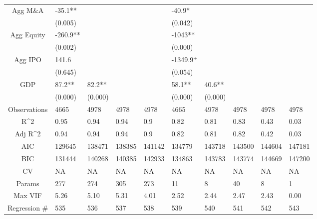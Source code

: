 \documentclass{article}
\begin{document}
\begin{table}[H]
\begin{tabular}{|clllllllll|}
  Agg M\&A & -35.1** &  &  &  & -40.9* &  &  &  &  \\ 
   & (0.005) &  &  &  & (0.042) &  &  &  &  \\ 
  Agg Equity & -260.9** &  &  &  & -1043** &  &  &  &  \\ 
   & (0.002) &  &  &  & (0.000) &  &  &  &  \\ 
  Agg IPO & 141.6 &  &  &  & -1349.9$^{+}$ &  &  &  &  \\ 
   & (0.645) &  &  &  & (0.054) &  &  &  &  \\ 
  GDP & 87.2** & 82.2** &  &  & 58.1** & 40.6** &  &  &  \\ 
   & (0.000) & (0.000) &  &  & (0.000) & (0.000) &  &  &  \\ 
  \hline 
 Observations & 4665 & 4978 & 4978 & 4978 & 4665 & 4978 & 4978 & 4978 & 4978 \\ 
  R^2 & 0.95 & 0.94 & 0.94 & 0.9 & 0.82 & 0.81 & 0.83 & 0.43 & 0.03 \\ 
  Adj R^2 & 0.94 & 0.94 & 0.94 & 0.9 & 0.82 & 0.81 & 0.82 & 0.42 & 0.03 \\ 
  AIC & 129645 & 138471 & 138385 & 141142 & 134779 & 143718 & 143500 & 144604 & 147181 \\ 
  BIC & 131444 & 140268 & 140385 & 142933 & 134863 & 143783 & 143774 & 144669 & 147200 \\ 
  CV & NA & NA & NA & NA & NA & NA & NA & NA & NA \\ 
  Params & 277 & 274 & 305 & 273 & 11 & 8 & 40 & 8 & 1 \\ 
  Max VIF & 5.26 & 5.10 & 5.31 & 4.01 & 2.52 & 2.44 & 2.47 & 2.43 & 0.00 \\ 
  Regression \# & 535 & 536 & 537 & 538 & 539 & 540 & 541 & 542 & 543 \\ 
   \hline
\end{tabular}
 
\end{table}
\end{document}
